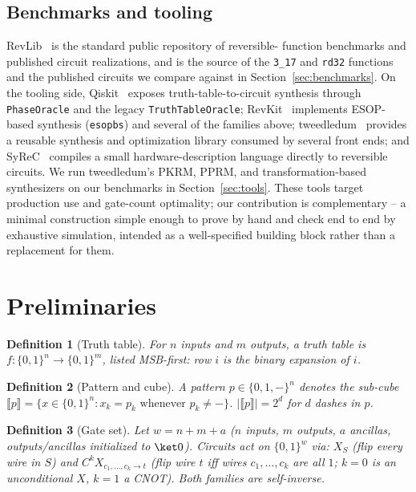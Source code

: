 \documentclass[conference]{IEEEtran}
\newcommand{\code}[1]{\texttt{#1}}
\theoremstyle{plain}
\newtheorem{definition}{Definition}
\begin{document}
\subsection{Benchmarks and tooling}
RevLib~\cite{revlib2008} is the standard public repository of reversible-
function benchmarks and published circuit realizations, and is the
source of the \texttt{3\_17} and \texttt{rd32} functions and the published
circuits we compare against in Section~\ref{sec:benchmarks}. On the tooling side,
Qiskit~\cite{qiskit2024} exposes truth-table-to-circuit synthesis through
\code{PhaseOracle} and the legacy \code{TruthTableOracle}; RevKit~\cite{soeken2012revkit}
implements ESOP-based synthesis (\code{esopbs}) and several of the
families above; tweedledum~\cite{schmitt2022} provides a reusable synthesis and optimization
library consumed by several front ends; and SyReC~\cite{wille2016syrec} compiles a small
hardware-description language directly to reversible circuits. We run
tweedledum's PKRM, PPRM, and transformation-based synthesizers on our
benchmarks in Section~\ref{sec:tools}. These
tools target production use and gate-count optimality; our contribution
is complementary -- a minimal construction simple enough to prove by
hand and check end to end by exhaustive simulation, intended as a well-specified building block
rather than a replacement for them.

\section{Preliminaries}

\begin{definition}[Truth table]
For $n$ inputs and $m$ outputs, a truth table is $f:\{0,1\}^n\to\{0,1\}^m$,
listed MSB-first: row $i$ is the binary expansion of $i$.
\end{definition}

\begin{definition}[Pattern and cube]
A pattern $p\in\{0,1,-\}^n$ denotes the sub-cube
$\llbracket p \rrbracket = \{x\in\{0,1\}^n : x_k=p_k \text{ whenever } p_k \ne {-}\}$.
$|\llbracket p \rrbracket| = 2^d$ for $d$ dashes in $p$.
\end{definition}

\begin{definition}[Gate set]
\label{def:gates}
Let $w=n+m+a$ ($n$ inputs, $m$ outputs, $a$ ancillas, outputs/ancillas
initialized to $\ket 0$). Circuits act on $\{0,1\}^w$ via: $X_S$ (flip every
wire in $S$) and $C^kX_{c_1,\dots,c_k\to t}$ (flip wire $t$ iff wires
$c_1,\dots,c_k$ are all $1$; $k=0$ is an unconditional $X$, $k=1$ a CNOT).
Both families are self-inverse.
\end{definition}
\end{document}
